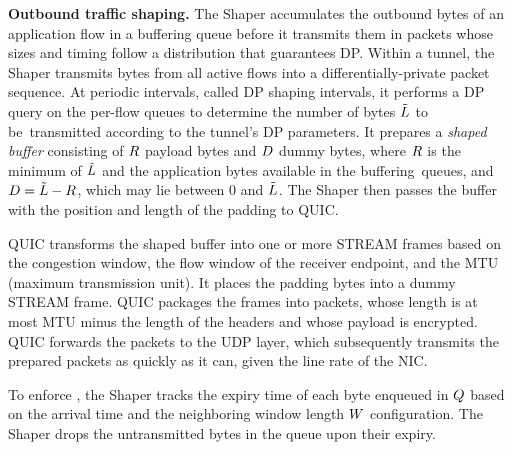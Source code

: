 \textbf{Outbound traffic shaping.}
The Shaper accumulates the outbound bytes of an application flow in a
buffering queue before it transmits them in packets whose sizes and timing
follow a distribution that guarantees DP.
Within a tunnel, the Shaper transmits bytes from all active flows into a
differentially-private packet sequence.
At periodic intervals, {called DP shaping intervals,} it performs a
DP query on the per-flow queues to determine the
number of bytes $\tilde{L}$ to be~transmitted according to the tunnel's DP
parameters. It prepares a {\em shaped buffer} consisting of $R$ payload
bytes and $D$ dummy bytes, where $R$ is the minimum of $\tilde{L}$ and
the application bytes available in the buffering~queues, and $D = \tilde{L} -
R$, which may lie between 0 and $\tilde{L}$. The Shaper then passes
the buffer with the position and length of the padding to QUIC.

QUIC transforms the shaped buffer into one or more STREAM frames based on the
congestion window, the flow window of the receiver endpoint, and the MTU
(maximum transmission unit). It
places the padding bytes into a dummy STREAM frame. QUIC packages the frames
into packets, whose length is at most MTU
minus the length of the headers and whose payload is
encrypted. QUIC forwards the packets to the UDP layer, which subsequently
transmits the prepared packets as quickly as it can, given the line rate of the
NIC.

To enforce , the Shaper tracks the expiry time of
each byte enqueued in $Q$ based on the arrival time and the neighboring
window length $W$ configuration. The Shaper drops the untransmitted bytes
in the queue upon their expiry.

%

